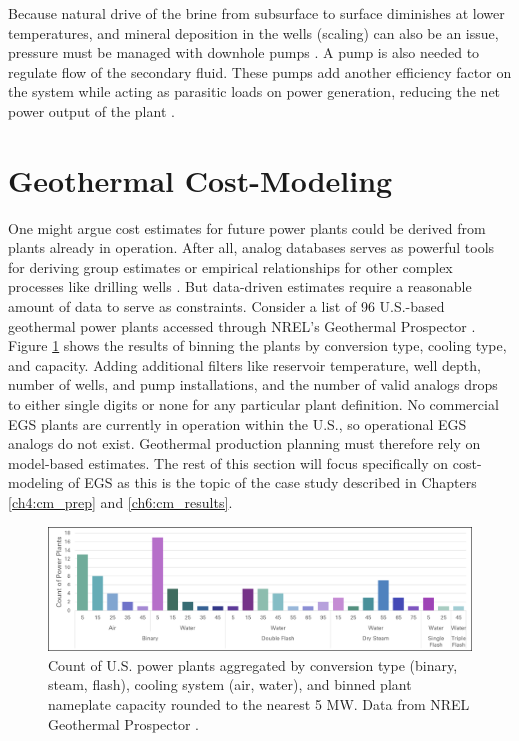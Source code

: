 Because natural drive of the brine from subsurface to surface diminishes at lower temperatures, and mineral deposition in the wells (scaling) can also be an issue, pressure must be managed with downhole pumps \citep[p.\ 153]{dipippo_geothermal_2012}. A pump is also needed to regulate flow of the secondary fluid. These pumps add another efficiency factor on the system while acting as parasitic loads on power generation, reducing the net power output of the plant \citep[Figure 2][]{lowry_implications_2017}.

\section{Geothermal Cost-Modeling}\label{ch2:cost_models}
One might argue cost estimates for future power plants could be derived from plants already in operation. After all, analog databases serves as powerful tools for deriving group estimates or empirical relationships for other complex processes like drilling wells \citep{lukawski_cost_2014, tester_future_2006}. But data-driven estimates require a reasonable amount of data to serve as constraints. Consider a list of 96 U.S.-based geothermal power plants accessed through NREL’s Geothermal Prospector \citep{nrel_geothermal_2021}. Figure \ref{fig:nrel_us_pplants} shows the results of binning the plants by conversion type, cooling type, and capacity. Adding additional filters like reservoir temperature, well depth, number of wells, and pump installations, and the number of valid analogs drops to either single digits or none for any particular plant definition. No commercial EGS plants are currently in operation within the U.S., so operational EGS analogs do not exist. Geothermal production planning must therefore rely on model-based estimates. The rest of this section will focus specifically on cost-modeling of EGS as this is the topic of the case study described in Chapters \ref{ch4:cm_prep} and \ref{ch6:cm_results}.

\begin{figure}
\centering
\includegraphics[width=.95\textwidth]{templates/images/Figure-NREL_US_PowerPlants.png}
\caption[Power plants in the United States]{Count of U.S. power plants aggregated by conversion type (binary, steam, flash), cooling system (air, water), and binned plant nameplate capacity rounded to the nearest 5 MW. Data from NREL Geothermal Prospector \protect\citep{nrel_geothermal_2021}.}
\label{fig:nrel_us_pplants}
\end{figure}

